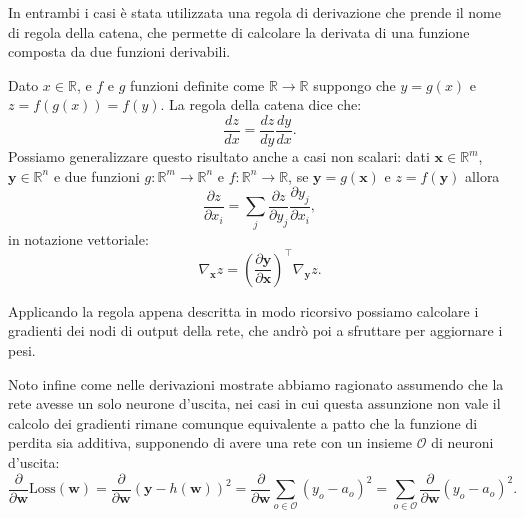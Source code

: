\documentclass[../../main.tex]{subfiles}
\begin{document}
In entrambi i casi è stata utilizzata una regola di derivazione che prende il nome di regola della catena, che permette di calcolare la derivata di una funzione composta da due funzioni derivabili.

Dato $x \in \mathbb{R}$, e $f$ e $g$ funzioni definite come $\mathbb{R} \rightarrow \mathbb{R}$ suppongo che $y = g(x)$ e $z = f(g(x)) = f(y)$. La regola della catena dice che:
\[\frac{dz}{dx} = \frac{dz}{dy} \frac{dy}{dx}.\]
Possiamo generalizzare questo risultato anche a casi non scalari: dati $\boldsymbol{x} \in \mathbb{R}^m$, $\boldsymbol{y} \in \mathbb{R}^n$ e due funzioni $g: \mathbb{R}^m \rightarrow \mathbb{R}^n$ e $f: \mathbb{R}^n \rightarrow \mathbb{R}$, se $\boldsymbol{y} = g(\boldsymbol{x})$ e $z = f(\boldsymbol{y})$ allora
\[\frac{\partial z}{\partial x_i} = \sum_j \frac{\partial z}{\partial y_j} \frac{\partial y_j}{\partial x_i},\]
in notazione vettoriale:
\[\nabla_{\boldsymbol{x}} z = \left(\frac{\partial \boldsymbol{y}}{\partial \boldsymbol{x}}\right)^\top \nabla_{\boldsymbol{y}} z.\]

Applicando la regola appena descritta in modo ricorsivo possiamo calcolare i gradienti dei nodi di output della rete, che andrò poi a sfruttare per aggiornare i pesi. 

Noto infine come nelle derivazioni mostrate abbiamo ragionato assumendo che la rete avesse un solo neurone d'uscita, nei casi in cui questa assunzione non vale il calcolo dei gradienti rimane comunque equivalente a patto che la funzione di perdita sia additiva, supponendo di avere una rete con un insieme $\mathcal{O}$ di neuroni d'uscita:
\[\frac{\partial}{\partial \boldsymbol{w}} \mathrm{Loss}(\boldsymbol{w}) = \frac{\partial}{\partial \boldsymbol{w}} (\boldsymbol{y} - h(\boldsymbol{w}))^2 = \frac{\partial}{\partial \boldsymbol{w}} \sum_{o \in \mathcal{O}} (y_o - a_o) ^ 2 = \sum_{o \in \mathcal{O}} \frac{\partial}{\partial \boldsymbol{w}} (y_o - a_o) ^ 2.\]
\end{document}
